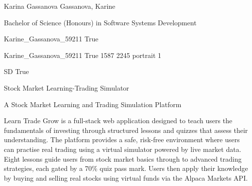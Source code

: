 \documentclass[twoside]{report}
\begin{document}
\begingroup{}\relax



\def\Key{Karine_Gassanova_59211}

{Karina Gassanova}
{Gassanova, Karine}

{Bachelor of Science (Honours) in Software Systems Development}

{Karine_Gassanova_59211}
{True}

{Karine_Gassanova_59211}
{True}
{1587}
{2245}
{portrait}
{1}

{SD}
{True}

{Stock Market Learning-Trading Simulator}

{A Stock Market Learning and Trading Simulation Platform}

{Learn Trade Grow is a full-stack web application designed to teach users the fundamentals of investing through structured lessons and quizzes that assess their understanding. The platform provides a safe, risk-free environment where users can practise real trading using a virtual simulator powered by live market data.  Eight lessons guide users from stock market basics through to advanced trading strategies, each gated by a 70\% quiz pass mark. Users then apply their knowledge by buying and selling real stocks using virtual funds via the Alpaca Markets API.}
\end{document}
